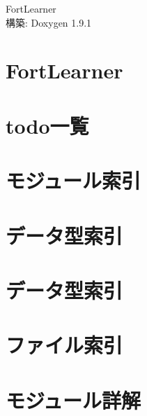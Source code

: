 \let\mypdfximage\pdfximage\def\pdfximage{\immediate\mypdfximage}\documentclass[twoside]{book}
\newcommand{\+}{\discretionary{\mbox{\scriptsize$\hookleftarrow$}}{}{}}
\newcommand{\clearemptydoublepage}{%
  \newpage{\pagestyle{empty}\cleardoublepage}%
}
\begin{document}
\raggedbottom
\begin{CJK}{UTF8}{min}

\hypersetup{pageanchor=false,
             bookmarksnumbered=true,
             pdfencoding=unicode
            }
\begin{titlepage}
\vspace*{7cm}
\begin{center}%
{\Large Fort\+Learner }\\
\vspace*{1cm}
{\large 構築\+: Doxygen 1.9.1}\\
\end{center}
\end{titlepage}
\clearemptydoublepage
{}
\tableofcontents
\clearemptydoublepage
{}
\hypersetup{pageanchor=true}

\chapter{Fort\+Learner}
\label{md__r_e_a_d_m_e}

\chapter{todo一覧}
\label{todo}

\chapter{モジュール索引}

\chapter{データ型索引}

\chapter{データ型索引}

\chapter{ファイル索引}

\chapter{モジュール詳解}












\end{CJK}
\end{document}
